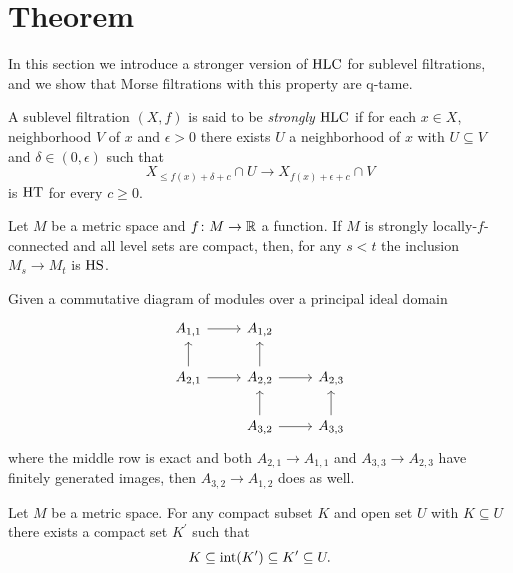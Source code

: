 
\section{Theorem} \label{sec:theorem}

In this section we introduce a stronger version of $\mathrm{HLC}$ for sublevel filtrations, and we show that Morse filtrations with this property are q-tame.

\begin{defi}
	A sublevel filtration $(X,f)$ is said to be \textit{strongly} $\mathrm{HLC}$ if for each $x \in X$, neighborhood $V$ of $x$ and $\epsilon > 0$ there exists $U$ a neighborhood of $x$ with $U \subseteq V$ and $\delta \in (0, \epsilon)$ such that
	\begin{equation*}
	X_{\leq f(x) + \delta + c} \cap U \to X_{f(x) + \epsilon + c} \cap V
	\end{equation*}
	is $\mathrm{HT}$ for every $c \geq 0$.
\end{defi}

\begin{thm} \label{t:strong local connectenss implies q-tameness}
	Let $M$ be a metric space and $f \colon M \to \mathbb{R}$ a function. If $M$ is strongly locally-$f$-connected and all level sets are compact, then, for any $s < t$ the inclusion $M_s \to M_t$ is $\mathrm{HS}$.
\end{thm}

\begin{lem} \label{l:commutative algebra}
	Given a commutative diagram of modules over a principal ideal domain
	\begin{equation*}
	\begin{tikzcd}
	A_{1,1} \arrow[r] & A_{1,2} & \\
	A_{2,1} \arrow[r] \arrow[u] & A_{2,2} \arrow[r] \arrow[u] & A_{2,3} \\
	& A_{3,2} \arrow[r] \arrow[u] & A_{3,3} \arrow[u]
	\end{tikzcd}
	\end{equation*}
	where the middle row is exact and both $A_{2,1} \to A_{1,1}$ and $A_{3,3} \to A_{2,3}$ have finitely generated images, then $A_{3,2} \to A_{1,2}$ does as well.
\end{lem}

\begin{lem} \label{l:neighborhood third}
	Let $M$ be a metric space. For any compact subset $K$ and open set $U$ with $K \subseteq U$ there exists a compact set $K^\prime$ such that
	\begin{equation*}
	K \subseteq \operatorname{int}(K^\prime) \subseteq K^\prime \subseteq U.
	\end{equation*}
\end{lem}

